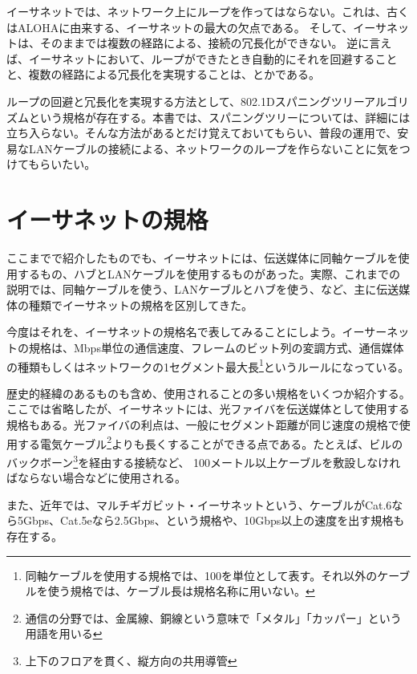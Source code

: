 イーサネットでは、ネットワーク上にループを作ってはならない。これは、古くはALOHAに由来する、イーサネットの最大の欠点である。
そして、イーサネットは、そのままでは複数の経路による、接続の冗長化ができない。
逆に言えば、イーサネットにおいて、ループができたとき自動的にそれを回避することと、複数の経路による冗長化を実現することは、とかである。

ループの回避と冗長化を実現する方法として、802.1Dスパニングツリーアルゴリズムという規格が存在する。本書では、スパニングツリーについては、詳細には立ち入らない。そんな方法があるとだけ覚えておいてもらい、普段の運用で、安易なLANケーブルの接続による、ネットワークのループを作らないことに気をつけてもらいたい。

\section{イーサネットの規格}

ここまでで紹介したものでも、イーサネットには、伝送媒体に同軸ケーブルを使用するもの、ハブとLANケーブルを使用するものがあった。実際、これまでの説明では、同軸ケーブルを使う、LANケーブルとハブを使う、など、主に伝送媒体の種類でイーサネットの規格を区別してきた。

今度はそれを、イーサネットの規格名で表してみることにしよう。イーサーネットの規格は、Mbps単位の通信速度、フレームのビット列の変調方式、通信媒体の種類もしくはネットワークの1セグメント最大長\footnote{同軸ケーブルを使用する規格では、100を単位として表す。それ以外のケーブルを使う規格では、ケーブル長は規格名称に用いない。}というルールになっている。

歴史的経緯のあるものも含め、使用されることの多い規格をいくつか紹介する。ここでは省略したが、イーサネットには、光ファイバを伝送媒体として使用する規格もある。光ファイバの利点は、一般にセグメント距離が同じ速度の規格で使用する電気ケーブル\footnote{通信の分野では、金属線、銅線という意味で「メタル」「カッパー」という用語を用いる}よりも長くすることができる点である。たとえば、ビルのバックボーン\footnote{上下のフロアを貫く、縦方向の共用導管}を経由する接続など、 100メートル以上ケーブルを敷設しなければならない場合などに使用される。

また、近年では、マルチギガビット・イーサネットという、ケーブルがCat.6なら5Gbps、Cat.5eなら2.5Gbps、という規格や、10Gbps以上の速度を出す規格も存在する。

